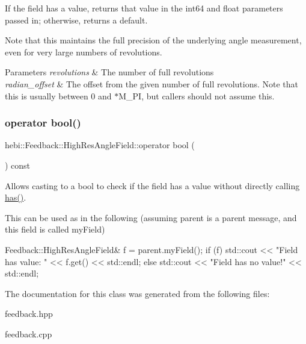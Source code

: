 If the field has a value, returns that value in the int64 and float parameters passed in; otherwise, returns a default. 

Note that this maintains the full precision of the underlying angle measurement, even for very large numbers of revolutions.


\begin{DoxyParams}{Parameters}
{\em revolutions} & The number of full revolutions\\
\hline
{\em radian\+\_\+offset} & The offset from the given number of full revolutions. Note that this is usually between 0 and {$\ast$\+M\+\_\+\+PI}, but callers should not assume this. \\
\hline
\end{DoxyParams}
\mbox{\label{classhebi_1_1Feedback_1_1HighResAngleField_aec95d30e5ac2d4e874b44056091d25eb}} 
\subsubsection{\texorpdfstring{operator bool()}{operator bool()}}
{\footnotesize\ttfamily hebi\+::\+Feedback\+::\+High\+Res\+Angle\+Field\+::operator bool (\begin{DoxyParamCaption}{ }\end{DoxyParamCaption}) const\hspace{0.3cm}{\ttfamily [explicit]}}



Allows casting to a bool to check if the field has a value without directly calling {\ttfamily \hyperlink{classhebi_1_1Feedback_1_1HighResAngleField_a5d3c8b5a153e1e0fcec716f4d6371d9c}{has()}}. 

This can be used as in the following (assuming \textquotesingle{}parent\textquotesingle{} is a parent message, and this field is called \textquotesingle{}my\+Field\textquotesingle{}) 
\begin{DoxyCode}
Feedback::HighResAngleField& f = parent.myField();
\textcolor{keywordflow}{if} (f)
  std::cout << \textcolor{stringliteral}{"Field has value: "} << f.get() << std::endl;
\textcolor{keywordflow}{else}
  std::cout << \textcolor{stringliteral}{"Field has no value!"} << std::endl;
\end{DoxyCode}
 

The documentation for this class was generated from the following files\+:\begin{DoxyCompactItemize}
\item 
feedback.\+hpp\item 
feedback.\+cpp\end{DoxyCompactItemize}
